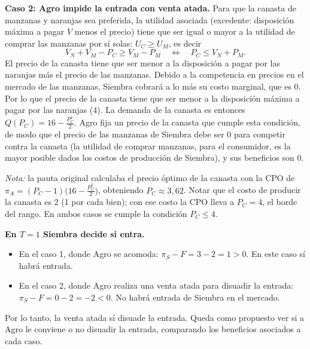 \begin{parts}
\begin{solution}
\textbf{Caso 2: Agro impide la entrada con venta atada.} Para que la canasta de manzanas y naranjas sea preferida, la utilidad asociada (excedente: disposición máxima a pagar $V$ menos el precio) tiene que ser igual o mayor a la utilidad de comprar las manzanas por sí solas: $U_C \geq U_M$, es decir
\[
  V_N + V_M - P_C \geq V_M - P_M \quad\Longleftrightarrow\quad P_C \leq V_N + P_M .
\]
El precio de la canasta tiene que ser menor a la disposición a pagar por las naranjas más el precio de las manzanas. Debido a la competencia en precios en el mercado de las manzanas, Siembra cobrará a lo más su costo marginal, que es $0$. Por lo que el precio de la canasta tiene que ser menor a la disposición máxima a pagar por las naranjas (4). La demanda de la canasta es entonces $Q(P_C) = 16 - \frac{P_C^2}{2}$. Agro fija un precio de la canasta que cumple esta condición, de modo que el precio de las manzanas de Siembra debe ser $0$ para competir contra la canasta (la utilidad de comprar manzanas, para el consumidor, es la mayor posible dados los costos de producción de Siembra), y sus beneficios son $0$.

\emph{Nota:} la pauta original calculaba el precio óptimo de la canasta con la CPO de $\pi_A = (P_C - 1)\bigl(16 - \frac{P_C^2}{2}\bigr)$, obteniendo $P_C \approx 3{,}62$. Notar que el costo de producir la canasta es 2 (1 por cada bien); con ese costo la CPO lleva a $P_C = 4$, el borde del rango. En ambos casos se cumple la condición $P_C \leq 4$.

\textbf{En $T=1$ Siembra decide si entra.}
\begin{itemize}
  \item En el caso 1, donde Agro se acomoda: $\pi_S - F = 3 - 2 = 1 > 0$. En este caso sí habrá entrada.
  \item En el caso 2, donde Agro realiza una venta atada para disuadir la entrada: $\pi_S - F = 0 - 2 = -2 < 0$. No habrá entrada de Siembra en el mercado.
\end{itemize}
Por lo tanto, la venta atada sí disuade la entrada. Queda como propuesto ver si a Agro le conviene o no disuadir la entrada, comparando los beneficios asociados a cada caso.

\end{solution}
\end{parts}

